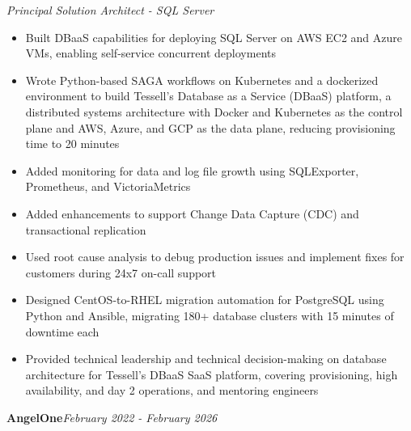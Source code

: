 \documentclass[10pt,a4paper]{article}
\begin{document}
\textit{Principal Solution Architect - SQL Server}\\[-5pt]
\begin{itemize}
  \item Built DBaaS capabilities for deploying SQL Server on AWS EC2 and Azure VMs, enabling self-service concurrent deployments
  \item Wrote Python-based SAGA workflows on Kubernetes and a dockerized environment to build Tessell's Database as a Service (DBaaS) platform, a distributed systems architecture with Docker and Kubernetes as the control plane and AWS, Azure, and GCP as the data plane, reducing provisioning time to 20 minutes
  \item Added monitoring for data and log file growth using SQLExporter, Prometheus, and VictoriaMetrics
  \item Added enhancements to support Change Data Capture (CDC) and transactional replication
  \item Used root cause analysis to debug production issues and implement fixes for customers during 24x7 on-call support
  \item Designed CentOS-to-RHEL migration automation for PostgreSQL using Python and Ansible, migrating 180+ database clusters with 15 minutes of downtime each
  \item Provided technical leadership and technical decision-making on database architecture for Tessell's DBaaS SaaS platform, covering provisioning, high availability, and day 2 operations, and mentoring engineers
\end{itemize}
\vspace{14.7pt}
\noindent\textbf{AngelOne}\hfill \textit{February 2022 - February 2026}
\end{document}
